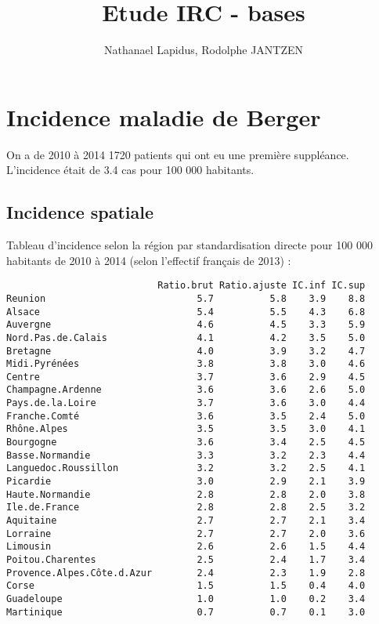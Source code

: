 \documentclass[11pt,a4paper]{article}\usepackage[]{graphicx}\usepackage[]{color}
\author{Nathanael Lapidus, Rodolphe JANTZEN}
\title{Etude IRC - bases}
\makeatletter
\newenvironment{kframe}{%
 \def\at@end@of@kframe{}%
 \ifinner\ifhmode%
  \def\at@end@of@kframe{\end{minipage}}%
  \begin{minipage}{\columnwidth}%
 \fi\fi%
 \def\FrameCommand##1{\hskip\@totalleftmargin \hskip-\fboxsep
 \colorbox{shadecolor}{##1}\hskip-\fboxsep
     \hskip-\linewidth \hskip-\@totalleftmargin \hskip\columnwidth}%
 \MakeFramed {\advance\hsize-\width
   \@totalleftmargin\z@ \linewidth\hsize
   \@setminipage}}%
 {\par\unskip\endMakeFramed%
 \at@end@of@kframe}
\newenvironment{knitrout}{}{} %
\makeatother
\begin{document}
\maketitle





\section{Incidence maladie de Berger}

On a de 2010 à 2014 1720 patients qui ont eu une première suppléance. L'incidence était de 3.4 cas pour 100 000 habitants.

  \subsection{Incidence spatiale}

Tableau d'incidence selon la région par standardisation directe pour 100 000 habitants de 2010 à 2014 (selon l'effectif français de 2013) :
\begin{knitrout}
\color{fgcolor}\begin{kframe}
\begin{verbatim}
                           Ratio.brut Ratio.ajuste IC.inf IC.sup
Reunion                           5.7          5.8    3.9    8.8
Alsace                            5.4          5.5    4.3    6.8
Auvergne                          4.6          4.5    3.3    5.9
Nord.Pas.de.Calais                4.1          4.2    3.5    5.0
Bretagne                          4.0          3.9    3.2    4.7
Midi.Pyrénées                     3.8          3.8    3.0    4.6
Centre                            3.7          3.6    2.9    4.5
Champagne.Ardenne                 3.6          3.6    2.6    5.0
Pays.de.la.Loire                  3.7          3.6    3.0    4.4
Franche.Comté                     3.6          3.5    2.4    5.0
Rhône.Alpes                       3.5          3.5    3.0    4.1
Bourgogne                         3.6          3.4    2.5    4.5
Basse.Normandie                   3.3          3.2    2.3    4.4
Languedoc.Roussillon              3.2          3.2    2.5    4.1
Picardie                          3.0          2.9    2.1    3.9
Haute.Normandie                   2.8          2.8    2.0    3.8
Ile.de.France                     2.8          2.8    2.5    3.2
Aquitaine                         2.7          2.7    2.1    3.4
Lorraine                          2.7          2.7    2.0    3.6
Limousin                          2.6          2.6    1.5    4.4
Poitou.Charentes                  2.5          2.4    1.7    3.4
Provence.Alpes.Côte.d.Azur        2.4          2.3    1.9    2.8
Corse                             1.5          1.5    0.4    4.0
Guadeloupe                        1.0          1.0    0.2    3.4
Martinique                        0.7          0.7    0.1    3.0
\end{verbatim}
\end{kframe}
\end{knitrout}
\end{document}
